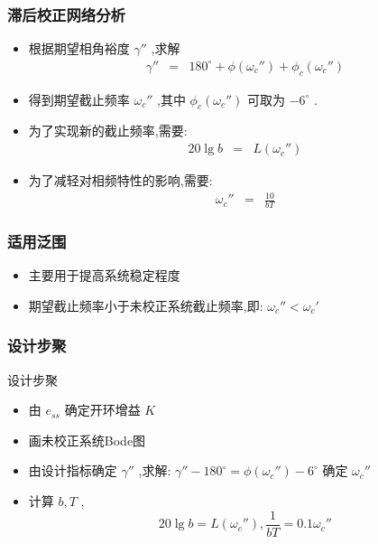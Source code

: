 \documentclass[table]{beamer}
\begin{document}
\begin{frame}
\frametitle{滞后校正网络分析}
\label{sec-3-1-2}

\begin{itemize}
\item 根据期望相角裕度 $\gamma''$ ,求解
      \begin{eqnarray*}
      \gamma'' & = &180^{\circ}+\phi(\omega_c'')+\phi_c(\omega_c'') 
      \end{eqnarray*}
\item <2->得到期望截止频率 $\omega_c''$ ,其中 $\phi_c(\omega_c'')$ 可取为 $-6^\circ$ .
\item <3->为了实现新的截止频率,需要:
      \begin{eqnarray*}
      20\lg b & = & L(\omega_c'') 
      \end{eqnarray*}
\item <4->为了减轻对相频特性的影响,需要:
      \begin{eqnarray*}
       \omega_c'' & = & \frac{10}{bT}
      \end{eqnarray*}
\end{itemize}
\end{frame}
\begin{frame}
\frametitle{适用泛围}
\label{sec-3-1-3}

\begin{itemize}
\item 主要用于提高系统稳定程度
\item 期望截止频率小于未校正系统截止频率,即: $\omega_c''<\omega_c'$
\end{itemize}
\end{frame}
\begin{frame}
\frametitle{设计步聚}
\label{sec-3-1-4}

设计步聚
\begin{itemize}
\item 由 $e_{ss}$ 确定开环增益 $K$
\item 画未校正系统Bode图
\item <2->由设计指标确定 $\gamma''$ ,求解:  $\gamma''-180^{\circ} = \phi(\omega_c'')-6^{\circ}$ 确定 $\omega_c''$
\item <3->计算 $b,T$ , 
         \[20\lg b=L(\omega_c''),\frac{1}{bT}=0.1\omega_c''\]
\end{itemize}
\end{frame}
\end{document}
